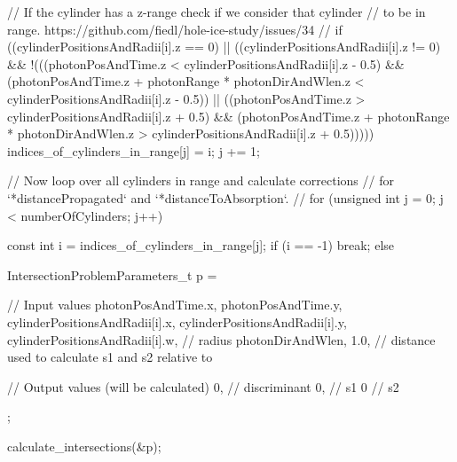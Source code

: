 \begin{ccode}
{{{{        // If the cylinder has a z-range check if we consider that cylinder
        // to be in range. https://github.com/fiedl/hole-ice-study/issues/34
        //
        if ((cylinderPositionsAndRadii[i].z == 0) || ((cylinderPositionsAndRadii[i].z != 0) && !(((photonPosAndTime.z < cylinderPositionsAndRadii[i].z - 0.5) && (photonPosAndTime.z + photonRange * photonDirAndWlen.z < cylinderPositionsAndRadii[i].z - 0.5)) || ((photonPosAndTime.z > cylinderPositionsAndRadii[i].z + 0.5) && (photonPosAndTime.z + photonRange * photonDirAndWlen.z > cylinderPositionsAndRadii[i].z + 0.5)))))
        {
          indices_of_cylinders_in_range[j] = i;
          j += 1;
        }
      }
    }
  }

  // Now loop over all cylinders in range and calculate corrections
  // for `*distancePropagated` and `*distanceToAbsorption`.
  //
  for (unsigned int j = 0; j < numberOfCylinders; j++) {
    const int i = indices_of_cylinders_in_range[j];
    if (i == -1) {
      break;
    } else {

      IntersectionProblemParameters_t p = {

        // Input values
        photonPosAndTime.x,
        photonPosAndTime.y,
        cylinderPositionsAndRadii[i].x,
        cylinderPositionsAndRadii[i].y,
        cylinderPositionsAndRadii[i].w, // radius
        photonDirAndWlen,
        1.0, // distance used to calculate s1 and s2 relative to

        // Output values (will be calculated)
        0, // discriminant
        0, // s1
        0  // s2

      };

      calculate_intersections(&p);

}}}
\end{ccode}
